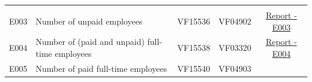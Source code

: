 \documentclass[]{book}
\begin{document}
\begin{longtable}[]{@{}clccc@{}}
\begin{minipage}[t]{0.20\columnwidth}
\end{minipage}\tabularnewline
\begin{minipage}[t]{0.10\columnwidth}\centering
E003\strut
\end{minipage} & \begin{minipage}[t]{0.25\columnwidth}\raggedright
Number of unpaid employees\strut
\end{minipage} & \begin{minipage}[t]{0.12\columnwidth}\centering
VF15536\strut
\end{minipage} & \begin{minipage}[t]{0.19\columnwidth}\centering
VF04902\strut
\end{minipage} & \begin{minipage}[t]{0.20\columnwidth}\centering
\href{./Auxiliary\%20Files/technical_reports/variable_report/E003.pdf}{Report - E003}\strut
\end{minipage}\tabularnewline
\begin{minipage}[t]{0.10\columnwidth}\centering
E004\strut
\end{minipage} & \begin{minipage}[t]{0.25\columnwidth}\raggedright
Number of (paid and unpaid) full-time employees\strut
\end{minipage} & \begin{minipage}[t]{0.12\columnwidth}\centering
VF15538\strut
\end{minipage} & \begin{minipage}[t]{0.19\columnwidth}\centering
VF03320\strut
\end{minipage} & \begin{minipage}[t]{0.20\columnwidth}\centering
\href{./Auxiliary\%20Files/technical_reports/variable_report/E004.pdf}{Report - E004}\strut
\end{minipage}\tabularnewline
\begin{minipage}[t]{0.10\columnwidth}\centering
E005\strut
\end{minipage} & \begin{minipage}[t]{0.25\columnwidth}\raggedright
Number of paid full-time employees\strut
\end{minipage} & \begin{minipage}[t]{0.12\columnwidth}\centering
VF15540\strut
\end{minipage} & \begin{minipage}[t]{0.19\columnwidth}\centering
VF04903\strut
\end{minipage} & \begin{minipage}[t]{0.20\columnwidth}\centering

\end{minipage}
\end{longtable}
\end{document}
